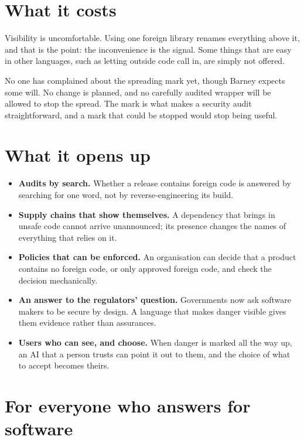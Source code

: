 \section{What it costs}

Visibility is uncomfortable. Using one foreign library renames everything
above it, and that is the point: the inconvenience is the signal. Some things
that are easy in other languages, such as letting outside code call in, are
simply not offered.

No one has complained about the spreading mark yet, though Barney expects some
will. No change is planned, and no carefully audited wrapper will be allowed to
stop the spread. The mark is what makes a security audit straightforward, and a
mark that could be stopped would stop being useful.

\section{What it opens up}

\begin{itemize}
  \item \textbf{Audits by search.} Whether a release contains foreign code is
        answered by searching for one word, not by reverse-engineering its
        build.
  \item \textbf{Supply chains that show themselves.} A dependency that brings
        in unsafe code cannot arrive unannounced; its presence changes the
        names of everything that relies on it.
  \item \textbf{Policies that can be enforced.} An organisation can decide
        that a product contains no foreign code, or only approved foreign
        code, and check the decision mechanically.
  \item \textbf{An answer to the regulators' question.} Governments now ask
        software makers to be secure by design. A language that makes danger
        visible gives them evidence rather than assurances.
  \item \textbf{Users who can see, and choose.} When danger is marked all the
        way up, an AI that a person trusts can point it out to them, and the
        choice of what to accept becomes theirs.
\end{itemize}

\section{For everyone who answers for software}


